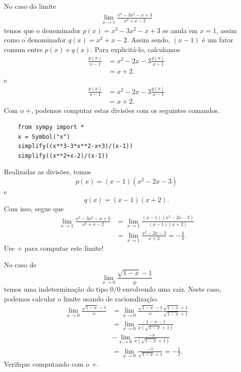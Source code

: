 \begin{ex}
  No caso do limite
  \begin{align}
    \lim_{x\to 1} \frac{x^3-3x^2-x+3}{x^2+x-2}
  \end{align}
  temos que o denominador $p(x) = x^3-3x^2-x+3$ se anula em $x=1$, assim como o denominador $q(x) = x^2+x-2$. Assim sendo, $(x-1)$ é um fator comum entre $p(x)$ e $q(x)$. Para explicitá-lo, calculamos
  \begin{align}
    \frac{p(x)}{x-1} &= x^2-2x-3\frac{q(x)}{x-1}\\
                     &= x+2.
  \end{align}
  e
  \begin{align}
    \frac{p(x)}{x-1} &= x^2-2x-3\frac{q(x)}{x-1}\\
                     &= x+2.
  \end{align}
  \ifispython
  Com o {\python}+{\sympy}, podemos computar estas divisões com os seguintes comandos.
  \begin{lstlisting}
    from sympy import *
    x = Symbol("x")
    simplify((x**3-3*x**2-x+3)/(x-1))
    simplify((x**2+x-2)/(x-1))
  \end{lstlisting}
  \fi
  Realizadas as divisões, temos
  \begin{equation}
    p(x) = (x-1)(x^2-2x-3)
  \end{equation}
  e
  \begin{equation}
    q(x)=(x-1)(x+2).
  \end{equation}
  Com isso, segue que
  \begin{align}
    \lim_{x\to 1} \frac{x^3-3x^2-x+3}{x^2+x-2} &= \lim_{x\to 1} \frac{(x-1)(x^2-2x-3)}{(x-1)(x+2)} \\
    &= \lim_{x\to 1} \frac{x^2-2x-3}{x+2} = -\frac{4}{3}.
  \end{align}
  \ifispython
  Use {\python}+{\sympy} para computar este limite!
  \fi
\end{ex}

\begin{ex}
  No caso de
  \begin{equation}
    \lim_{x\to 0} \frac{\sqrt{1-x}-1}{x}
  \end{equation}
  temos uma indeterminação do tipo $0/0$ envolvendo uma raiz. Neste caso, podemos calcular o limite usando de racionalização.
  \begin{align}
    \lim_{x\to 0} \frac{\sqrt{1-x}-1}{x} &= \lim_{x\to 0} \frac{\sqrt{1-x}-1}{x}\frac{\sqrt{1-x}+1}{\sqrt{1-x}+1}\\
                                         &= \lim_{x\to 0} \frac{1-x-1}{x(\sqrt{1-x}+1)} \\
                                         &- \lim_{x\to 0} \frac{-x}{x(\sqrt{1-x}+1)}\\
    &= \lim_{x\to 0} \frac{-1}{\sqrt{1-x}+1} = -\frac{1}{2}.
  \end{align}
  \ifispython
  Verifique computando com o {\python}+{\sympy}. 
  \fi
\end{ex}

